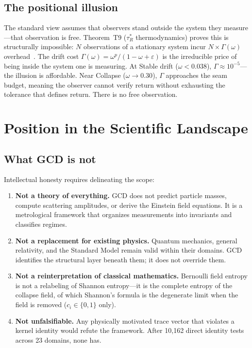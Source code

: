 \documentclass[
  aps,
  prd,
  twocolumn,
  superscriptaddress,
  nofootinbib,
  floatfix
]{revtex4-2}
\newcommand{\tRS}{\tau_{\!R}^{*}}
\newcommand{\Gam}{\Gamma}
\newcommand{\eps}{\varepsilon}
\begin{document}
\subsection{The positional illusion}

The standard view assumes that observers stand outside the system
they measure---that observation is free.  Theorem~T9 ($\tRS$
thermodynamics) proves this is structurally impossible: $N$
observations of a stationary system incur $N \times \Gam(\omega)$
overhead~\cite{paulus2025seamreality}.  The drift cost
$\Gam(\omega) = \omega^p / (1 - \omega + \eps)$ is the irreducible
price of being inside the system one is measuring.  At Stable drift
($\omega < 0.038$), $\Gam \approx 10^{-5}$---the illusion is
affordable.  Near Collapse ($\omega \to 0.30$), $\Gam$ approaches the
seam budget, meaning the observer cannot verify return without
exhausting the tolerance that defines return.  There is no free
observation.

\section{Position in the Scientific Landscape}\label{sec:landscape}

\subsection{What GCD is not}

Intellectual honesty requires delineating the scope:

\begin{enumerate}[leftmargin=*,label=(\roman*)]
\item \textbf{Not a theory of everything.}  GCD does not predict
  particle masses, compute scattering amplitudes, or derive the
  Einstein field equations.  It is a metrological framework that
  organizes measurements into invariants and classifies regimes.

\item \textbf{Not a replacement for existing physics.}  Quantum
  mechanics, general relativity, and the Standard Model remain
  valid within their domains.  GCD identifies the structural layer
  beneath them; it does not override them.

\item \textbf{Not a reinterpretation of classical mathematics.}
  Bernoulli field entropy is not a relabeling of Shannon
  entropy---it is the complete entropy of the collapse field, of
  which Shannon's formula is the degenerate limit when the field is
  removed ($c_i \in \{0,1\}$ only).

\item \textbf{Not unfalsifiable.}  Any physically motivated trace
  vector that violates a kernel identity would refute the framework.
  After 10{,}162 direct identity tests across 23 domains, none has.
\end{enumerate}
\end{document}
